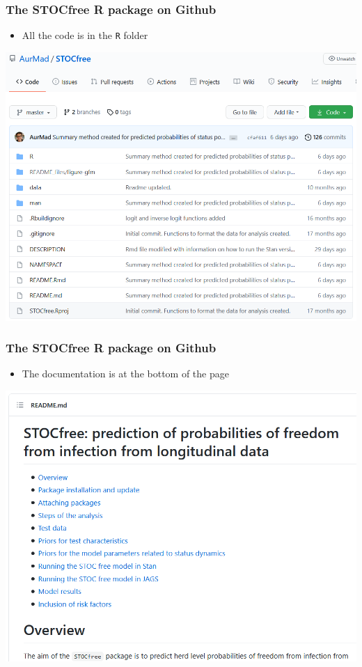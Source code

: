 \documentclass{beamer}
\begin{document}
\begin{frame}
\frametitle{The STOCfree R package on Github}
\begin{itemize}
 \item{All the code is in the \texttt{R} folder}
\end{itemize}
\includegraphics[width=.9\textwidth]{imgs/STOCfree_Github.png}
\end{frame}

\begin{frame}
\frametitle{The STOCfree R package on Github}
\begin{itemize}
 \item{The documentation is at the bottom of the page}
\end{itemize}
\includegraphics[width=.9\textwidth]{imgs/STOCfree_Github_1.png}
\end{frame}
\end{document}
